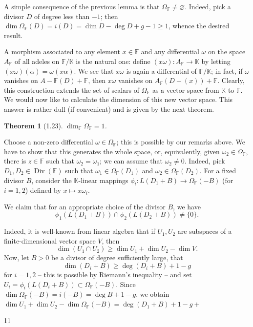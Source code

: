 \documentclass[11pt]{article}
\theoremstyle{scplain}
\newtheorem*{theorem}{Theorem}
\DeclareMathOperator{\Div}{Div}
\begin{document}
A simple consequence of the previous lemma is that
$\Omega_{\mathbb{F}} \neq \varnothing$. Indeed, pick a divisor $D$ of degree
less than $-1$; then
$\dim \Omega_{\mathbb{F}}(D) = i(D) = \dim D-\deg D+g-1 \geq 1$, whence the
desired result.

A morphism associated to any element $x \in \mathbb{F}$ and any differential
$\omega$ on the space $A_{\mathbb{F}}$ of all adeles on
$\mathbb{F}/\mathbb{K}$ is the natural one: define
$(x\omega) : A_{\mathbb{F}} \longrightarrow \mathbb{K}$ by letting
$(x\omega)(\alpha) = \omega(x\alpha)$. We see that $x\omega$ is again a
differential of $\mathbb{F}/\mathbb{K}$; in fact, if $\omega$ vanishes on
$A-\mathbb{F}(D)+\mathbb{F}$, then $x\omega$ vanishes on
$A_{\mathbb{F}}(D+(x))+\mathbb{F}$. Clearly, this construction extends the set
of scalars of $\Omega_{\mathbb{F}}$ as a vector space from $\mathbb{K}$ to
$\mathbb{F}$. We would now like to calculate the dimension of this new vector
space. This answer is rather dull (if convenient) and is given by the next
theorem.

\begin{theorem}[1.23]
$\dim_{\mathbb{F}} \Omega_{\mathbb{F}} = 1$.
\end{theorem}

\medskip{} Choose a non-zero differential
$\omega \in \Omega_{\mathbb{F}}$; this is possible by our remarks above. We have
to show that this generates the whole space, or, equivalently, given
$\omega_2 \in \Omega_{\mathbb{F}}$, there is $z \in \mathbb{F}$ such that
$\omega_2 = \omega_1$; we can assume that $\omega_2 \neq 0$. Indeed, pick
$D_1,D_2 \in \Div(\mathbb{F})$ such that
$\omega_1 \in \Omega_{\mathbb{F}}(D_1)$ and
$\omega_2 \in \Omega_{\mathbb{F}}(D_2)$. For a fixed divisor $B$, consider the
$\mathbb{K}$-linear mappings
$\phi_i : L(D_1+B) \longrightarrow \Omega_{\mathbb{F}}(-B)$ (for $i=1,2$)
defined by $x \mapsto x\omega_i$.

We claim that for an appropriate choice of the divisor $B$, we have
\[
  \phi_1(L(D_1+B)) \cap \phi_2(L(D_2+B)) \neq \{0\}.
\]

Indeed, it is well-known from linear algebra that if $U_1,U_2$ are subspaces of
a finite-dimensional vector space $V$, then
\[
  \dim(U_1 \cap U_2) \geq \dim U_1 + \dim U_2 - \dim V.
\]
Now, let $B > 0$ be a divisor of degree sufficiently large, that
\[
  \dim(D_i+B) \geq \deg(D_i+B) + 1 - g
\]
for $i=1,2$ -- this is possible by Riemann's inequality -- and set
$U_i = \phi_i(L(D_i+B)) \subset \Omega_{\mathbb{F}}(-B)$. Since
$\dim \Omega_{\mathbb{F}}(-B) = i(-B) = \deg B + 1 - g$, we obtain
$\dim U_1 + \dim U_2 - \dim \Omega_{\mathbb{F}}(-B)
= \deg(D_1+B)+1-g+$

\begin{center}11\end{center}
\end{document}
